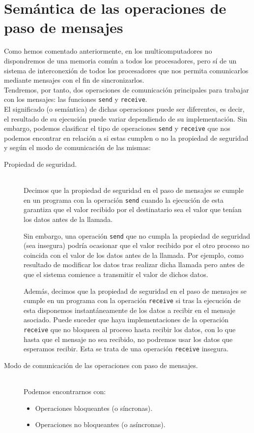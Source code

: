 \section{Semántica de las operaciones de paso de mensajes}
Como hemos comentado anteriormente, en los multicomputadores no dispondremos de una memoria común a todos los procesadores, pero sí de un sistema de interconexión de todos los procesadores que nos permita comunicarlos mediante mensajes con el fin de sincronizarlos.\\

Tendremos, por tanto, dos operaciones de comunicación principales para trabajar con los mensajes: las funciones \verb|send| y \verb|receive|.\\

El significado (o semántica) de dichas operaciones puede ser diferentes, es decir, el resultado de su ejecución puede variar dependiendo de su implementación. Sin embargo, podemos clasificar el tipo de operaciones \verb|send| y \verb|receive| que nos podemos encontrar en relación a si estas cumplen o no la propiedad de seguridad y según el modo de comunicación de las mismas:

\begin{description}
    \item [Propiedad de seguridad.]~\\
        Decimos que la propiedad de seguridad en el paso de mensajes se cumple en un programa con la operación \verb|send| cuando la ejecución de esta garantiza que el valor recibido por el destinatario sea el valor que tenían los datos antes de la llamada.

        Sin embargo, una operación \verb|send| que no cumpla la propiedad de seguridad (sea insegura) podría ocasionar que el valor recibido por el otro proceso no coincida con el valor de los datos antes de la llamada. Por ejemplo, como resultado de modificar los datos tras realizar dicha llamada pero antes de que el sistema comience a transmitir el valor de dichos datos.

        Además, decimos que la propiedad de seguridad en el paso de mensajes se cumple en un programa con la operación \verb|receive| si tras la ejecución de esta disponemos instantáneamente de los datos a recibir en el mensaje asociado. Puede suceder que haya implementaciones de la operación \verb|receive| que no bloqueen al proceso hasta recibir los datos, con lo que hasta que el mensaje no sea recibido, no podremos usar los datos que esperamos recibir. Esta se trata de una operación \verb|receive| insegura.
    \item [Modo de comunicación de las operaciones con paso de mensajes.]~\\
        Podemos encontrarnos con:
        \begin{itemize}
            \item Operaciones bloqueantes (o síncronas).
            \item Operaciones no bloqueantes (o asíncronas).
        \end{itemize}
\end{description}

